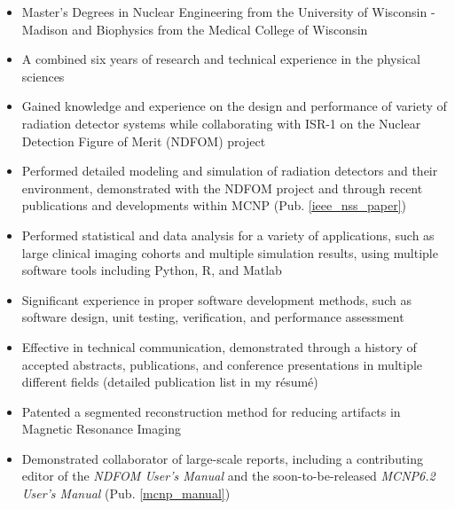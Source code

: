 \begin{center}
\begin{minipage}{\textwidth}
  \begin{itemize}[leftmargin=.15in,rightmargin=.25in,itemsep=1.0mm]

	\item Master's Degrees in Nuclear Engineering from the University of Wisconsin - Madison and Biophysics from the Medical College of Wisconsin
	\item A combined six years of research and technical experience in the physical sciences
		
	\item Gained knowledge and experience on the design and performance of variety of radiation detector systems while collaborating with ISR-1 on the Nuclear Detection Figure of Merit (NDFOM) project
	
	\item Performed detailed modeling and simulation of radiation detectors and their environment, demonstrated with the NDFOM project and through recent publications and developments within \textsc{MCNP} (Pub. \ref{ieee_nss_paper})
	\item Performed statistical and data analysis for a variety of applications, such as large clinical imaging cohorts and multiple simulation results, using multiple software tools including Python, R, and Matlab
		
	\item Significant experience in proper software development methods, such as software design, unit testing, verification, and performance assessment
		
	\item Effective in technical communication, demonstrated through a history of accepted abstracts, publications, and conference presentations in multiple different fields (detailed publication list in my r\'{e}sum\'{e})
	\item Patented a segmented reconstruction method for reducing artifacts in Magnetic Resonance Imaging
	\item Demonstrated collaborator of large-scale reports, including a contributing editor of the \textit{NDFOM User's Manual} and the soon-to-be-released \textit{MCNP6.2 User's Manual} (Pub. \ref{mcnp_manual})
	

\end{itemize}
\end{minipage}
\end{center}
